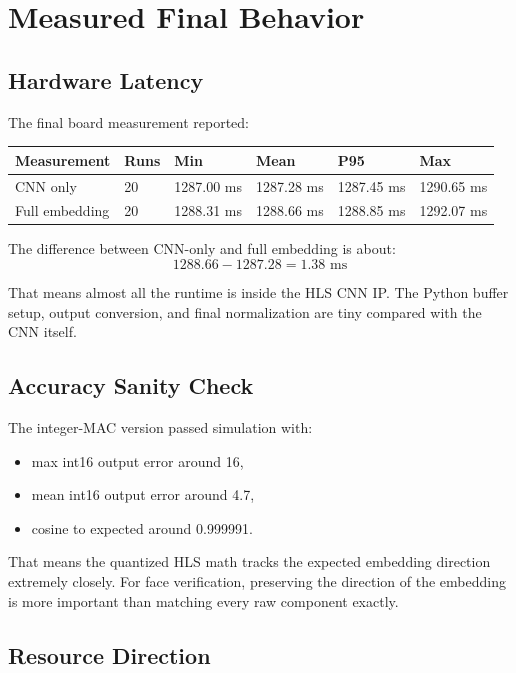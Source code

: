 \documentclass[11pt]{article}
\begin{document}
\section{Measured Final Behavior}

\subsection{Hardware Latency}

The final board measurement reported:

\begin{center}
\begin{tabular}{llllll}
\toprule
Measurement & Runs & Min & Mean & P95 & Max \\
\midrule
CNN only & 20 & 1287.00 ms & 1287.28 ms & 1287.45 ms & 1290.65 ms \\
Full embedding & 20 & 1288.31 ms & 1288.66 ms & 1288.85 ms & 1292.07 ms \\
\bottomrule
\end{tabular}
\end{center}

The difference between CNN-only and full embedding is about:
\[
  1288.66 - 1287.28 = 1.38 \text{ ms}
\]

That means almost all the runtime is inside the HLS CNN IP.
The Python buffer setup, output conversion, and final normalization are tiny compared with the CNN itself.

\subsection{Accuracy Sanity Check}

The integer-MAC version passed simulation with:

\begin{itemize}[leftmargin=1.4em]
  \item max int16 output error around 16,
  \item mean int16 output error around 4.7,
  \item cosine to expected around 0.999991.
\end{itemize}

That means the quantized HLS math tracks the expected embedding direction extremely closely.
For face verification, preserving the direction of the embedding is more important than matching every raw component exactly.

\subsection{Resource Direction}
\end{document}

